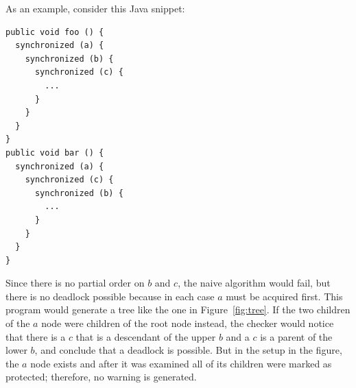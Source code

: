 \documentclass{article}
\begin{document}
\begin{multicols}{2}
As an example, consider this Java snippet:
\begin{verbatim}
public void foo () {
  synchronized (a) {
    synchronized (b) {
      synchronized (c) {
        ...
      }
    }
  }
}
public void bar () {
  synchronized (a) {
    synchronized (c) {
      synchronized (b) {
        ...
      }
    }
  }
}
\end{verbatim}
Since there is no partial order on $b$ and $c$, the naive algorithm
would fail, but there is no deadlock possible because in each case $a$
must be acquired first.  This program would generate a tree like the
one in Figure~\ref{fig:tree}.  If the two children of the $a$ node
were children of the root node instead, the checker would notice that
there is a $c$ that is a descendant of the upper $b$ and a $c$ is a
parent of the lower $b$, and conclude that a deadlock is possible.
But in the setup in the figure, the $a$ node exists and after it was
examined all of its children were marked as protected; therefore, no
warning is generated.


\end{multicols}
\end{document}
